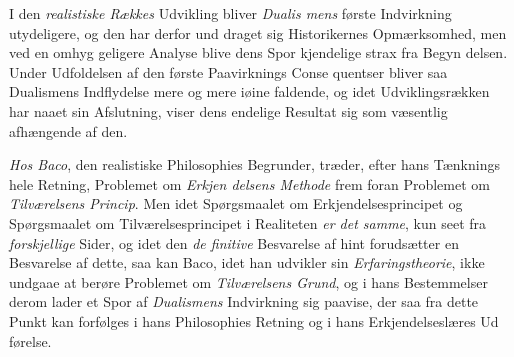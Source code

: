 I den \emph{realistiske Rækkes} Udvikling bliver \emph{Dualis\-%
mens} første Indvirkning utydeligere, og den har derfor und\-%
draget sig Historikernes Opmærksomhed, men ved en omhyg\-%
geligere Analyse blive dens Spor kjendelige strax fra Begyn\-%
delsen. Under Udfoldelsen af den første Paavirknings Conse\-%
quentser bliver saa Dualismens Indflydelse mere og mere iøine\-%
faldende, og idet Udviklingsrækken har naaet sin Afslutning,
viser dens endelige Resultat sig som væsentlig afhængende
af den.

\emph{Hos Baco}, den realistiske Philosophies Begrunder, træder,
efter hans Tænknings hele Retning, Problemet om \emph{Erkjen\-%
delsens Methode} frem foran Problemet om \emph{Tilværelsens
Princip}. Men idet Spørgsmaalet om Erkjendelsesprincipet
og Spørgsmaalet om Tilværelsesprincipet i Realiteten \emph{er det
samme}, kun seet fra \emph{forskjellige} Sider, og idet den \emph{de\-%
finitive} Besvarelse af hint forudsætter en Besvarelse af dette,
saa kan Baco, idet han udvikler sin \emph{Erfaringstheorie}, ikke
undgaae at berøre Problemet om \emph{Tilværelsens Grund}, og
i hans Bestemmelser derom lader et Spor af \emph{Dualismens}
Indvirkning sig paavise, der saa fra dette Punkt kan forfølges
i hans Philosophies Retning og i hans Erkjendelseslæres Ud\-%
førelse.

